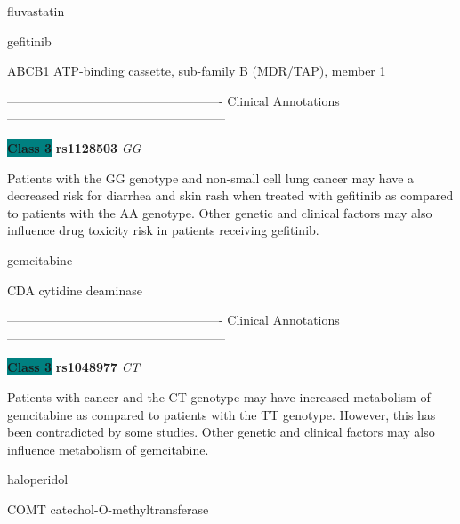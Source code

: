 \documentclass{resume} %
\begin{document}
\begin{rSection}{ fluvastatin }
\end{rSection}\begin{rSection}{ gefitinib }
\item[]

\begin{rSubsection}{ ABCB1 }{ ATP-binding cassette, sub-family B (MDR/TAP), member 1 }{}{}
\item[]

\item[] ---------------------------------------------------- Clinical Annotations -----------------------------------------------------\newline
\item \textbf{\colorbox{teal} {Class 3}} \textbf{ rs1128503 } \textit{ GG }
\item[] Patients with the GG genotype and non-small cell lung cancer may have a decreased risk for diarrhea and skin rash when treated with gefitinib as compared to patients with the AA genotype. Other genetic and clinical factors may also influence drug toxicity risk in patients receiving gefitinib.
\end{rSubsection}

\end{rSection}\begin{rSection}{ gemcitabine }
\item[]

\begin{rSubsection}{ CDA }{ cytidine deaminase }{}{}
\item[]

\item[] ---------------------------------------------------- Clinical Annotations -----------------------------------------------------\newline
\item \textbf{\colorbox{teal} {Class 3}} \textbf{ rs1048977 } \textit{ CT }
\item[] Patients with cancer and the CT genotype may have increased metabolism of gemcitabine as compared to patients with the TT genotype. However, this has been contradicted by some studies. Other genetic and clinical factors may also influence metabolism of gemcitabine. 
\end{rSubsection}

\end{rSection}\begin{rSection}{ haloperidol }
\item[]

\begin{rSubsection}{ COMT }{ catechol-O-methyltransferase }{}{}
\item[]


\end{rSubsection}
\end{rSection}
\end{document}
